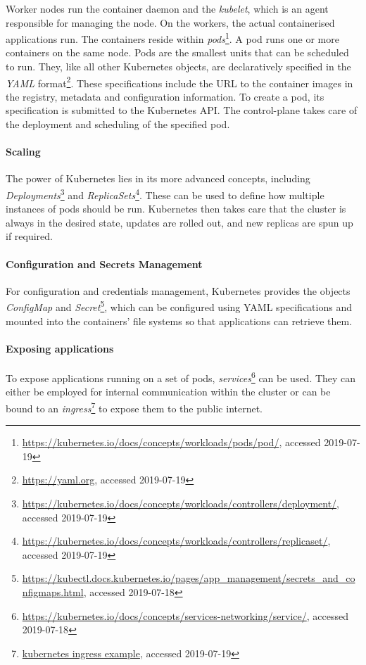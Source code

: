Worker nodes run the container daemon and the \textit{kubelet}, which is an agent responsible for managing the node. On the workers, the actual containerised applications run. The containers reside within \textit{pods}\footnote{\url{https://kubernetes.io/docs/concepts/workloads/pods/pod/}, accessed 2019-07-19}. A pod runs one or more containers on the same node. Pods are the smallest units that can be scheduled to run. They, like all other Kubernetes objects, are declaratively specified in the \textit{YAML} format\footnote{\url{https://yaml.org}, accessed 2019-07-19}. These specifications include the URL to the container images in the registry, metadata and configuration information. To create a pod, its specification is submitted to the Kubernetes API. The control-plane takes care of the deployment and scheduling of the specified pod. 

\paragraph{Scaling}

The power of Kubernetes lies in its more advanced concepts, including \textit{Deployments}\footnote{\url{https://kubernetes.io/docs/concepts/workloads/controllers/deployment/}, accessed 2019-07-19} and \textit{ReplicaSets}\footnote{\url{https://kubernetes.io/docs/concepts/workloads/controllers/replicaset/}, accessed 2019-07-19}. These can be used to define how multiple instances of pods should be run. Kubernetes then takes care that the cluster is always in the desired state, updates are rolled out, and new replicas are spun up if required.

\paragraph{Configuration and Secrets Management}

For configuration and credentials management, Kubernetes provides the objects \textit{ConfigMap} and \textit{Secret}\footnote{\url{https://kubectl.docs.kubernetes.io/pages/app_management/secrets_and_configmaps.html}, accessed 2019-07-18}, which can be configured using YAML specifications and mounted into the containers' file systems so that applications can retrieve them.

\paragraph{Exposing applications}

To expose applications running on a set of pods, \textit{services}\footnote{\url{https://kubernetes.io/docs/concepts/services-networking/service/}, accessed 2019-07-18} can be used. They can either be employed for internal communication within the cluster or can be bound to an \textit{ingress}\footnote{\url{kubernetes ingress example}, accessed 2019-07-19} to expose them to the public internet. 

